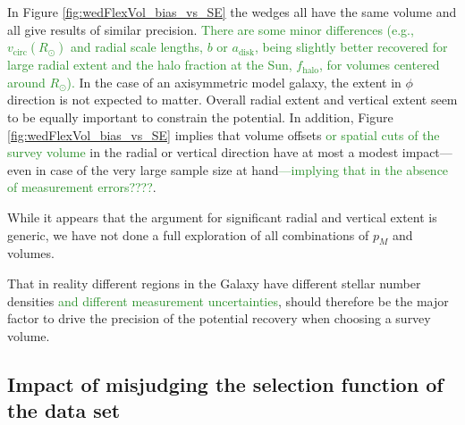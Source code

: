 \documentclass[iop,revtex4]{emulateapj}
\newcommand{\pmodel}{\ensuremath{p_M}}
\newcommand{\NEW}[1]{\textcolor{ForestGreen}{#1}}
\newcommand{\OLD}[1]{}
\begin{document}
In Figure \ref{fig:wedFlexVol_bias_vs_SE} the wedges all have the same volume and all give results of similar precision. \OLD{Minor differences (e.g., the \texttt{Iso-Pot} potential being less constrained in the wedge with large vertical but small radial extent) are a special property of the considered potential and parameters, and not a global property of the corresponding survey volume.}\NEW{There are some minor differences (e.g., $v_\text{circ}(R_\odot)$ and radial scale lengths, $b$ or $a_\text{disk}$, being slightly better recovered for large radial extent and the halo fraction at the Sun, $f_\text{halo}$, for volumes centered around $R_\odot$).} In the case of an axisymmetric model galaxy, the extent in $\phi$ direction is not expected to matter. Overall radial extent and vertical extent seem to be equally important to constrain the potential. In addition, Figure \ref{fig:wedFlexVol_bias_vs_SE} implies that volume offsets \NEW{or spatial cuts of the survey volume} in the radial or vertical direction have at most a modest impact---even in case of the very large sample size at hand\NEW{---implying that in the absence of measurement errors????}.

While it appears that the argument for significant radial and vertical extent is generic, we have not done a full exploration of all combinations of \pmodel{} and volumes.

That in reality different regions in the Galaxy have different stellar number densities\NEW{ and different measurement uncertainties}, should therefore be the major factor to drive the precision of the potential recovery when choosing a survey volume.

\subsection{Impact of misjudging the selection function of the data set} \label{sec:results_incompR}
\end{document}

